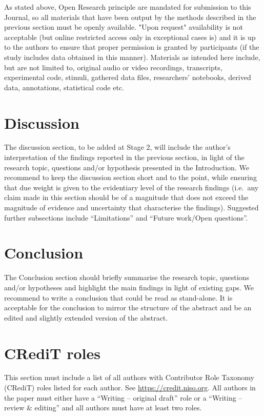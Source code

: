 \documentclass[
]{rrling}
\begin{document}
As stated above, Open Research principle are mandated for submission to
this Journal, so all materials that have been output by the methods
described in the previous section must be openly available. "Upon
request" availability is not acceptable (but online restricted access
only in exceptional cases is) and it is up to the authors to ensure that
proper permission is granted by participants (if the study includes data
obtained in this manner). Materials as intended here include, but are
not limited to, original audio or video recordings, transcripts,
experimental code, stimuli, gathered data files, researchers' notebooks,
derived data, annotations, statistical code etc.

\section{Discussion}\label{discussion}

The discussion section, to be added at Stage 2, will include the
author's interpretation of the findings reported in the previous
section, in light of the research topic, questions and/or hypothesis
presented in the Introduction. We recommend to keep the discussion
section short and to the point, while ensuring that due weight is given
to the evidentiary level of the research findings (i.e.~any claim made
in this section should be of a magnitude that does not exceed the
magnitude of evidence and uncertainty that characterise the findings).
Suggested further subsections include ``Limitations'' and ``Future
work/Open questions''.

\section{Conclusion}\label{conclusion}

The Conclusion section should briefly summarise the research topic,
questions and/or hypotheses and highlight the main findings in light of
existing gaps. We recommend to write a conclusion that could be read as
stand-alone. It is acceptable for the conclusion to mirror the structure
of the abstract and be an edited and slightly extended version of the
abstract.

\section*{CRediT roles}\label{credit-roles}

This section must include a list of all authors with Contributor Role
Taxonomy (CRediT) roles listed for each author. See
\url{https://credit.niso.org}. All authors in the paper must either have
a ``Writing -- original draft'' role or a ``Writing -- review \&
editing'' and all authors must have at least two roles.
\end{document}

